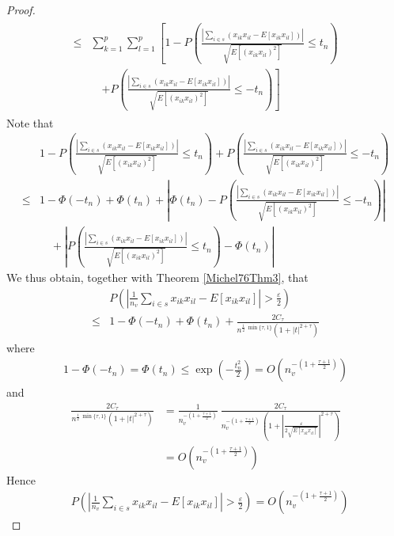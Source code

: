 \documentclass[Research_Module_ES.tex]{subfiles}
\begin{document}
\begin{proof}
\begin{align}
\begin{split}\label{dreieck}
\leq&\sum_{k=1}^{p}\sum_{l=1}^{p}\left[ 1-P\left( \frac{\left|\sum_{i\in s}\left(x_{ik}x_{il}-E[x_{ik}x_{il}]\right)\right|}{\sqrt{E[(x_{ik}x_{il})^2]}}\leq t_n \right) \right.\\
&\quad\left. + P\left( \frac{\left|\sum_{i\in s}\left(x_{ik}x_{il}-E[x_{ik}x_{il}]\right)\right|}{\sqrt{E[(x_{ik}x_{il})^2]}}\leq -t_n \right) \right]
\end{split}
\end{align}
Note that
\begin{align*}
 &1-P\left( \frac{\left|\sum_{i\in s}\left(x_{ik}x_{il}-E[x_{ik}x_{il}]\right)\right|}{\sqrt{E[(x_{ik}x_{il})^2]}}\leq t_n \right) + P\left( \frac{\left|\sum_{i\in s}\left(x_{ik}x_{il}-E[x_{ik}x_{il}]\right)\right|}{\sqrt{E[(x_{ik}x_{il})^2]}}\leq -t_n \right) \\
 \leq&1-\Phi(-t_n)+\Phi(t_n)+\left| \Phi(t_n)-P\left( \frac{\left|\sum_{i\in s}\left(x_{ik}x_{il}-E[x_{ik}x_{il}]\right)\right|}{\sqrt{E[(x_{ik}x_{il})^2]}}\leq -t_n\right) \right|\\
 &\quad+ \left|P\left(\frac{\left|\sum_{i\in s}\left(x_{ik}x_{il}-E[x_{ik}x_{il}]\right)\right|}{\sqrt{E[(x_{ik}x_{il})^2]}} \leq t_n\right) -\Phi(t_n)\right|
\end{align*}
We thus obtain, together with Theorem \ref{Michel76Thm3}, that
\begin{align*}
&P\left(\left| \frac{1}{n_v}\sum_{i\in s}x_{ik}x_{il}-E[x_{ik} x_{il}] \right|>\frac{\varepsilon}{2}\right)\\
\leq&1-\Phi(-t_n)+\Phi(t_n)+\frac{2C_\tau}{n^{\frac{1}{2}~ \min\{\tau,1\}} (1+|t|^{2+\tau}) }
\end{align*}
where 
\begin{align*}
1-\Phi(-t_n)=\Phi(t_n)\leq\exp\left(-\frac{t_n^2}{2}\right)=O\left(n_v^{-\left(1+\frac{\tau+1}{2}\right)}\right)
\end{align*}
and
\begin{align*}
\frac{2C_\tau}{n^{\frac{1}{2}~ \min\{\tau,1\}} (1+|t|^{2+\tau}) }&=\frac{1}{n_v^{-\left(1+\frac{\tau+1}{2}\right)}}~\frac{2C_\tau}{n_v^{-\left( 1+\frac{\tau+1}{2} \right)} ~\left(1+\left|  \frac{\varepsilon}{2\sqrt{E[x_{ik}x_{il}]}} \right|^{2+\tau}\right)  }\\
&=O\left(  n_v^{-\left( 1+\frac{\tau+1}{2}  \right)} \right)
\end{align*}
Hence
\begin{align*}
&P\left(\left| \frac{1}{n_v}\sum_{i\in s}x_{ik}x_{il}-E[x_{ik} x_{il}] \right|>\frac{\varepsilon}{2}\right)=O\left(n_v^{-\left(1+\frac{\tau+1}{2}\right)}\right)

\end{align*}
\end{proof}
\end{document}
